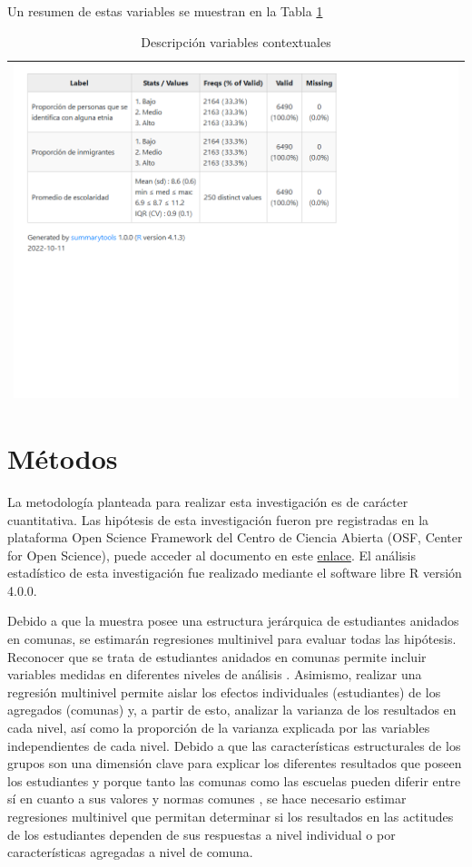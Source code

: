 \documentclass[12pt,twoside]{templates/facsothesis}
\begin{document}
Un resumen de estas variables se muestran en la Tabla \ref{tab:desc03}

\begin{longtable}[]{@{}l@{}}
\caption{\label{tab:desc03}Descripción variables contextuales}\tabularnewline
\toprule()
\endhead
\includegraphics{IPO/output/tables/desc03.png} \\
\bottomrule()
\end{longtable}

\hypertarget{muxe9todos}{%
\section{Métodos}\label{muxe9todos}}

La metodología planteada para realizar esta investigación es de carácter cuantitativa. Las hipótesis de esta investigación fueron pre registradas en la plataforma Open Science Framework del Centro de Ciencia Abierta (OSF, Center for Open Science), puede acceder al documento en este \href{https://doi.org/10.17605/OSF.IO/URPZQ}{enlace}. El análisis estadístico de esta investigación fue realizado mediante el software libre R versión 4.0.0.

Debido a que la muestra posee una estructura jerárquica de estudiantes anidados en comunas, se estimarán regresiones multinivel para evaluar todas las hipótesis. Reconocer que se trata de estudiantes anidados en comunas permite incluir variables medidas en diferentes niveles de análisis \citep{aguinis_BestPractice_2013}. Asimismo, realizar una regresión multinivel permite aislar los efectos individuales (estudiantes) de los agregados (comunas) y, a partir de esto, analizar la varianza de los resultados en cada nivel, así como la proporción de la varianza explicada por las variables independientes de cada nivel. Debido a que las características estructurales de los grupos son una dimensión clave para explicar los diferentes resultados que poseen los estudiantes \citep{trevino_Influence_2018} y porque tanto las comunas como las escuelas pueden diferir entre sí en cuanto a sus valores y normas comunes \citep{bayramozdemir_How_2020}, se hace necesario estimar regresiones multinivel que permitan determinar si los resultados en las actitudes de los estudiantes dependen de sus respuestas a nivel individual o por características agregadas a nivel de comuna.
\end{document}
